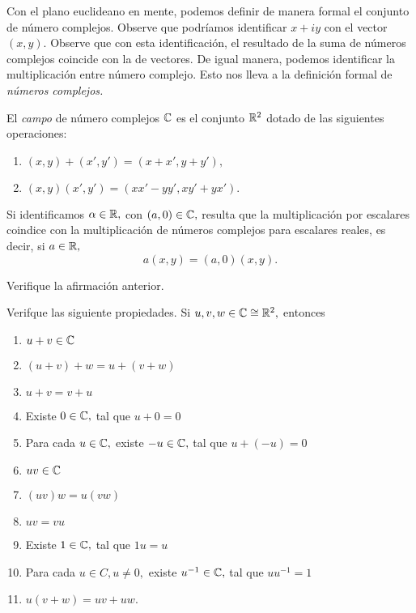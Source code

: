 Con el plano euclideano en mente, podemos definir de manera formal el conjunto de número complejos. Observe que
podríamos identificar $x+iy$ con el vector $(x,y).$ Observe que con esta identificación, el resultado de la suma de
números complejos coincide con la de vectores. De igual manera, podemos identificar la multiplicación entre número
complejo. Esto nos lleva a la definición formal de \emph{números complejos.}

\begin{definicion}
	El \emph{campo} de número complejos $\mathbb{C}$ es el conjunto $\mathbb{R}^{2}$ dotado de las siguientes operaciones:
	\begin{enumerate}
		\item
		$
		(x,y)+(x',y')=(x+x',y+y'),
		$
		\item
		$
		(x,y)(x',y')=(xx'-yy',xy'+yx').
		$
	\end{enumerate}
\end{definicion}


Si identificamos $\alpha \in \mathbb{R},$ con $(a,0) \in \mathbb{C},$ resulta que la multiplicación por escalares coindice con la
multiplicación de números complejos para escalares reales, es decir, si $a\in \mathbb{R},$
$$
a(x,y)=(a,0)(x,y).
$$

\begin{problema}
	Verifique la afirmación anterior.
\end{problema}


\begin{problema}
	Verifque las siguiente propiedades. Si $u,v,w \in \mathbb{C} \cong \mathbb{R}^{2},$ entonces
	\begin{enumerate}
		\item $u+v\in \mathbb{C}$ 
		\item $(u+v)+w=u+(v+w)$
		\item $u+v=v+u$
		\item Existe $0\in \mathbb{C},$ tal que $u+0=0$
		\item Para cada $u\in \mathbb{C},$ existe $-u\in\mathbb{C},$ tal que $u+(-u)=0$
		\item $uv \in \mathbb{C}$
		\item $(uv)w=u(vw)$
		\item $uv=vu$
		\item Existe $1\in \mathbb{C},$ tal que $1u=u$
		\item Para cada $u\in C, u \neq 0,$ existe $u^{-1}\in \mathbb{C},$ tal que $u u^{-1}=1$
		\item $u(v+w)=uv+uw.$
	\end{enumerate}
	
\end{problema}

